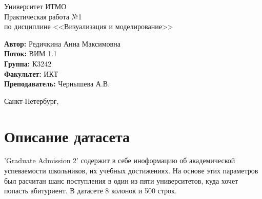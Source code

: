 \documentclass[12pt,a4paper]{article}
\begin{document}
	
	\begin{titlepage}
		
		\begin{center}
			\large Университет ИТМО\\[5cm]
			\LARGE Практическая работа №1\\
			\normalsize по дисциплине <<Визуализация и моделирование>>\\[5cm]
		\end{center}
		\begin{flushright}
			\begin{minipage}{0.6\textwidth}
				\begin{flushleft}
					\large
					\singlespacing 
					\textbf{Автор:} Редичкина Анна Максимовна\\
					\textbf{Поток:} ВИМ 1.1\\
					\textbf{Группа:} К3242\\
					\textbf{Факультет:} ИКТ\\
					\textbf{Преподаватель:} Чернышева А.В.
				\end{flushleft}
			\end{minipage}
		\end{flushright}
		
		\vfill
		
		\begin{center}
			{\large Санкт-Петербург, \the{}}
		\end{center}
		
	\end{titlepage}
	\normalsize
	
	
	\section{Описание датасета}
	'Graduate Admission 2' содержит в себе иноформацию об академической успеваемости школьников, их учебных достижениях. На основе этих параметров был расчитан шанс поступления в один из пяти университетов, куда хочет попасть абитуриент. В датасете 8 колонок и 500 строк. 
	
\end{document}
